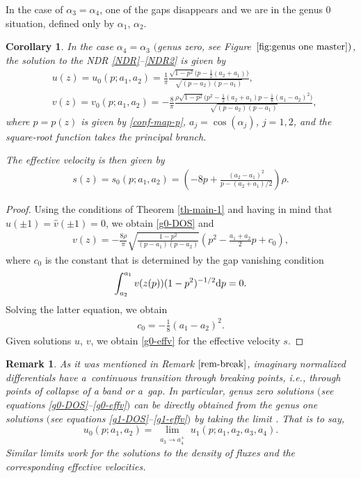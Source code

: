 \documentclass[pdftex]{sigma}
\numberwithin{equation}{section}
\newtheorem{Corollary}[Theorem]{Corollary}
\newtheorem{Remark}[Theorem]{Remark}
\def\ra{\rightarrow}
\def\a{\alpha}
\begin{document}
In the case of $\a_3=\a_4$, one of the gaps disappears and we are in the genus 0 situation, defined only by $\a_1$, $\a_2$.

\begin{Corollary}\label{g0-master case}
In the case $\alpha_4=\alpha_3$ $($genus zero, see Figure~$\ref{fig:genus one master})$, the solution to the NDR \eqref{NDR}--\eqref{NDR2} is given by
\begin{align}
&u(z)=u_0(p;a_1,a_2)=\frac{1}{\pi}\frac{\sqrt{1-p^2}\bigl(p-\frac{1}{2}(a_2+a_1)\bigr)}{\sqrt{(p-a_2)(p-a_1)}},\label{g0-DOS}\\
&v(z)=v_0(p;a_1,a_2)=-\frac{8}{\pi}\frac{\rho\sqrt{1-p^2}\bigl(p^2-\frac{1}{2}(a_2+a_1)p-\frac{1}{8}(a_1-a_2)^2\bigr)}{\sqrt{(p-a_2)(p-a_1)}},\label{g0-DOS-v}
\end{align}
where $p=p(z)$ is given by \eqref{conf-map-p},
%
$a_j=\cos(\alpha_j)$, $j=1,2$, and the square-root function takes the principal branch.

The effective velocity is then given by
\begin{align}
s(z)=s_0(p;a_1,a_2)=\left(-8p+\frac{(a_2-a_1)^2}{p-(a_2+a_1)/2}\right)\rho.\label{g0-effv}
\end{align}
\end{Corollary}

\begin{proof}
Using the conditions of Theorem \ref{th-main-1} and having in mind that $\hat u(\pm 1)= \hat v(\pm 1)=0$, we obtain \eqref{g0-DOS} and
\begin{align*}
v(z)=-\frac{8\rho}{\pi}\sqrt{\frac{1-p^2}{(p-a_1)(p-a_2)}}\left(p^2-\frac{a_1+a_2}{2}p+c_0\right),
\end{align*}
where $c_0$ is the constant that is determined by the gap vanishing condition
\begin{align*}
\int_{a_2}^{a_1}v(z(p))(1-p^2)^{-1/2}{\rm d}p=0.
\end{align*}
Solving the latter equation, we obtain
\begin{align*}
c_0=-\frac{1}{8}(a_1-a_2)^2.
\end{align*}
Given solutions $u$, $v$, we obtain \eqref{g0-effv} for the effective velocity $s$.
\end{proof}

\begin{Remark}
As it was mentioned in Remark $\ref{rem-break}$, imaginary normalized differentials have a~continuous transition through breaking points, i.e., through points of collapse of a band or a~gap. In particular,
genus zero solutions $($see equations \eqref{g0-DOS}--\eqref{g0-effv}$)$ can be directly obtained from the genus one solutions $($see equations \eqref{g1-DOS}--\eqref{g1-effv}$)$ by taking the limit \smash{$a_3\ra a_4^+$}. That is to say,
\[u_0(p;a_1,a_2)=\lim_{\substack{a_3\ra a_4^+}}u_1(p;a_1,a_2,a_3,a_4).\]
Similar limits work for the solutions to the density of fluxes and the corresponding effective velocities.
\end{Remark}
\end{document}
